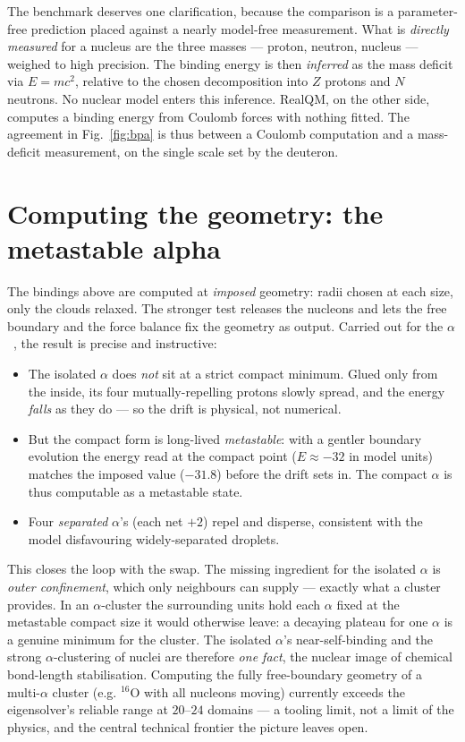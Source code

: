 \documentclass[11pt]{article}
\begin{document}
The benchmark deserves one clarification, because the comparison is a parameter-free prediction placed
against a nearly model-free measurement. What is \emph{directly measured} for a nucleus are the three
masses --- proton, neutron, nucleus --- weighed to high precision. The binding energy is then
\emph{inferred} as the mass deficit via $E=mc^2$, relative to the chosen decomposition into $Z$
protons and $N$ neutrons. No nuclear model enters this inference. RealQM, on the other side, computes a
binding energy from Coulomb forces with nothing fitted. The agreement in Fig.~\ref{fig:bpa} is thus
between a Coulomb computation and a mass-deficit measurement, on the single scale set by the deuteron.

\section{Computing the geometry: the metastable alpha}

The bindings above are computed at \emph{imposed} geometry: radii chosen at each size, only the clouds
relaxed. The stronger test releases the nucleons and lets the free boundary and the force balance fix
the geometry as output. Carried out for the $\alpha$~\cite{Johnson-RealNucleus}, the result is precise
and instructive:
\begin{itemize}\setlength{\itemsep}{2pt}
\item The isolated $\alpha$ does \emph{not} sit at a strict compact minimum. Glued only from the
inside, its four mutually-repelling protons slowly spread, and the energy \emph{falls} as they do --- so
the drift is physical, not numerical.
\item But the compact form is long-lived \emph{metastable}: with a gentler boundary evolution the
energy read at the compact point ($E\approx-32$ in model units) matches the imposed value ($-31.8$)
before the drift sets in. The compact $\alpha$ is thus computable as a metastable state.
\item Four \emph{separated} $\alpha$'s (each net $+2$) repel and disperse, consistent with the model
disfavouring widely-separated droplets.
\end{itemize}
This closes the loop with the swap. The missing ingredient for the isolated $\alpha$ is \emph{outer
confinement}, which only neighbours can supply --- exactly what a cluster provides. In an
$\alpha$-cluster the surrounding units hold each $\alpha$ fixed at the metastable compact size it would
otherwise leave: a decaying plateau for one $\alpha$ is a genuine minimum for the cluster. The isolated
$\alpha$'s near-self-binding and the strong $\alpha$-clustering of nuclei are therefore \emph{one
fact}, the nuclear image of chemical bond-length stabilisation. Computing the fully free-boundary
geometry of a multi-$\alpha$ cluster (e.g. $^{16}$O with all nucleons moving) currently exceeds the
eigensolver's reliable range at $20$--$24$ domains --- a tooling limit, not a limit of the physics, and
the central technical frontier the picture leaves open.
\end{document}

